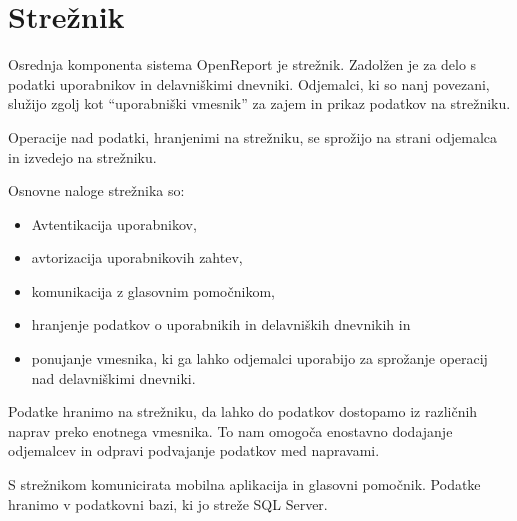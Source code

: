 \documentclass[a4paper, 12pt]{book}
\begin{document}




\section{Strežnik}

Osrednja komponenta sistema OpenReport je strežnik.
Zadolžen je za delo s podatki uporabnikov in delavniškimi dnevniki.
Odjemalci, ki so nanj povezani, služijo zgolj kot \enquote{uporabniški vmesnik} za zajem in prikaz podatkov na strežniku.

Operacije nad podatki, hranjenimi na strežniku, se sprožijo na strani odjemalca in izvedejo na strežniku.

Osnovne naloge strežnika so:
\begin{itemize}
	\item Avtentikacija uporabnikov,
	\item avtorizacija uporabnikovih zahtev,
	\item komunikacija z glasovnim pomočnikom,
	\item hranjenje podatkov o uporabnikih in delavniških dnevnikih in
	\item ponujanje vmesnika, ki ga lahko odjemalci uporabijo za sprožanje operacij nad delavniškimi dnevniki.
\end{itemize}

Podatke hranimo na strežniku, da lahko do podatkov dostopamo iz različnih naprav preko enotnega vmesnika.
To nam omogoča enostavno dodajanje odjemalcev in odpravi podvajanje podatkov med napravami.

S strežnikom komunicirata mobilna aplikacija in glasovni pomočnik.
Podatke hranimo v podatkovni bazi, ki jo streže SQL Server.
\end{document}
